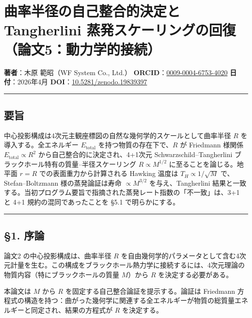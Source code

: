\documentclass[a4paper,11pt]{ltjsarticle}
\theoremstyle{definition}
\begin{document}
\section{曲率半径の自己整合的決定と Tangherlini
蒸発スケーリングの回復（論文5：動力学的接続）}\label{ux66f2ux7387ux534aux5f84ux306eux81eaux5df1ux6574ux5408ux7684ux6c7aux5b9aux3068-tangherlini-ux84b8ux767aux30b9ux30b1ux30fcux30eaux30f3ux30b0ux306eux56deux5fa9ux8ad6ux65875ux52d5ux529bux5b66ux7684ux63a5ux7d9a}

\textbf{著者}：木原 範昭（WF System Co., Ltd.）
\textbf{ORCID}：\href{https://orcid.org/0009-0004-6753-4020}{0009-0004-6753-4020}
\textbf{日付}：2026年4月
\textbf{DOI}：\href{https://doi.org/10.5281/zenodo.19839397}{10.5281/zenodo.19839397}

\begin{center}\rule{0.5\linewidth}{0.5pt}\end{center}

\subsection{要旨}\label{ux8981ux65e8}

中心投影構成は4次元主観座標図の自然な幾何学的スケールとして曲率半径
\(R\) を導入する。全エネルギー \(E_{\mathrm{total}}\)
を持つ物質の存在下で、\(R\) が Friedmann 様関係
\(E_{\mathrm{total}} \propto R^2\) から自己整合的に決定され、4+1次元
Schwarzschild--Tangherlini ブラックホール特有の質量--半径スケーリング
\(R \propto M^{1/2}\) に至ることを論じる。地平面 \(r = R\)
での表面重力から計算される Hawking 温度は \(T_H \propto 1/\sqrt{M}\)
で、Stefan--Boltzmann 様の蒸発論証は寿命 \(\propto M^{3/2}\)
を与え、Tangherlini
結果と一致する。当初プログラム要旨で指摘された蒸発レート指数の「不一致」は、3+1
と 4+1 規約の混同であったことを §5.1 で明らかにする。

\begin{center}\rule{0.5\linewidth}{0.5pt}\end{center}

\subsection{§1. 序論}\label{ux5e8fux8ad6}

論文2 の中心投影構成は、曲率半径 \(R\)
を自由幾何学的パラメータとして含む4次元計量を生む。この構成をブラックホール熱力学に接続するには、4次元理論の物質内容（特にブラックホールの質量
\(M\)）から \(R\) を決定する必要がある。

本論文は \(M\) から \(R\) を固定する自己整合論証を提示する。論証は
Friedmann
方程式の構造を持つ：曲がった幾何学に関連する全エネルギーが物質の総質量エネルギーと同定され、結果の方程式が
\(R\) を決定する。
\end{document}
